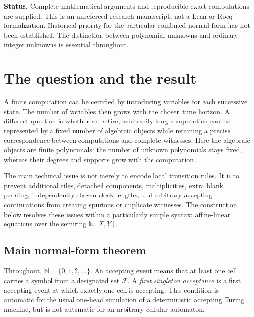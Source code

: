 \documentclass[11pt,letterpaper]{article}
\numberwithin{equation}{section}
\theoremstyle{definition}
\newcommand{\N}{\mathbb N}
\newcommand{\F}{\mathcal F}
\begin{document}
\begin{statementbox}
\textbf{Status.} Complete mathematical arguments and reproducible exact
computations are supplied. This is an unrefereed research manuscript, not a
Lean or Rocq formalization. Historical priority for the particular combined
normal form has not been established. The distinction between polynomial
unknowns and ordinary integer unknowns is essential throughout.
\end{statementbox}

\section{The question and the result}
\label{pwh:uh:sec:intro}

A finite computation can be certified by introducing variables for each
successive state. The number of variables then grows with the chosen time
horizon. A different question is whether an entire, arbitrarily long
computation can be represented by a fixed number of algebraic objects while
retaining a precise correspondence between computations and complete
witnesses. Here the algebraic objects are finite polynomials: the number of
unknown polynomials stays fixed, whereas their degrees and supports grow
with the computation.

The main technical issue is not merely to encode local transition rules.
It is to prevent additional tiles, detached components, multiplicities,
extra blank padding, independently chosen clock lengths, and arbitrary
accepting continuations from creating spurious or duplicate witnesses.
The construction below resolves these issues within a particularly simple
syntax: affine-linear equations over the semiring $\N[X,Y]$.

\subsection{Main normal-form theorem}

Throughout, $\N=\{0,1,2,\ldots\}$. An accepting event means that at least one
cell carries a symbol from a designated set $\F$. A \emph{first singleton
acceptance} is a first accepting event at which exactly one cell is
accepting. This condition is automatic for the usual one-head simulation
of a deterministic accepting Turing machine, but is not automatic for an
arbitrary cellular automaton.
\end{document}
